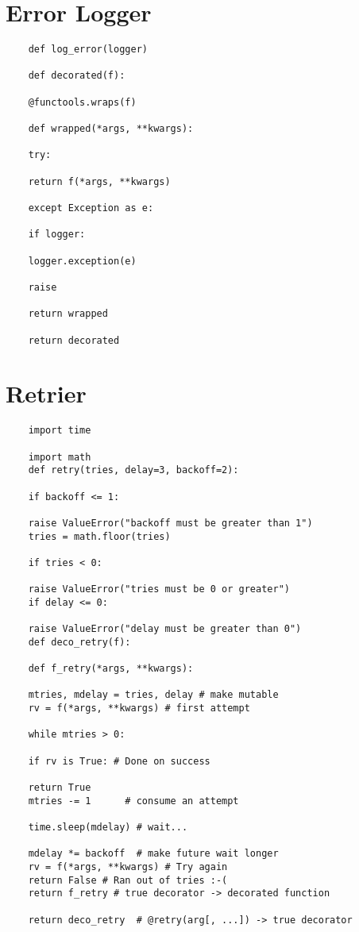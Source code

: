 \documentclass{article}
\begin{document}
\section {Error Logger}
\begin{lstlisting}
	def log_error(logger)
	
	def decorated(f):
	
	@functools.wraps(f)
	
	def wrapped(*args, **kwargs):
	
	try:
	
	return f(*args, **kwargs)
	
	except Exception as e:
	
	if logger:
	
	logger.exception(e)
	
	raise
	
	return wrapped
	
	return decorated
\end{lstlisting}

\section {Retrier}
\begin{lstlisting}
	import time
	
	import math
	def retry(tries, delay=3, backoff=2):
	
	if backoff <= 1:
	
	raise ValueError("backoff must be greater than 1")
	tries = math.floor(tries)
	
	if tries < 0:
	
	raise ValueError("tries must be 0 or greater")
	if delay <= 0:
	
	raise ValueError("delay must be greater than 0")
	def deco_retry(f):
	
	def f_retry(*args, **kwargs):
	
	mtries, mdelay = tries, delay # make mutable
	rv = f(*args, **kwargs) # first attempt
	
	while mtries > 0:
	
	if rv is True: # Done on success
	
	return True
	mtries -= 1      # consume an attempt
	
	time.sleep(mdelay) # wait...
	
	mdelay *= backoff  # make future wait longer
	rv = f(*args, **kwargs) # Try again
	return False # Ran out of tries :-(
	return f_retry # true decorator -> decorated function
	
	return deco_retry  # @retry(arg[, ...]) -> true decorator
\end{lstlisting}
\end{document}
